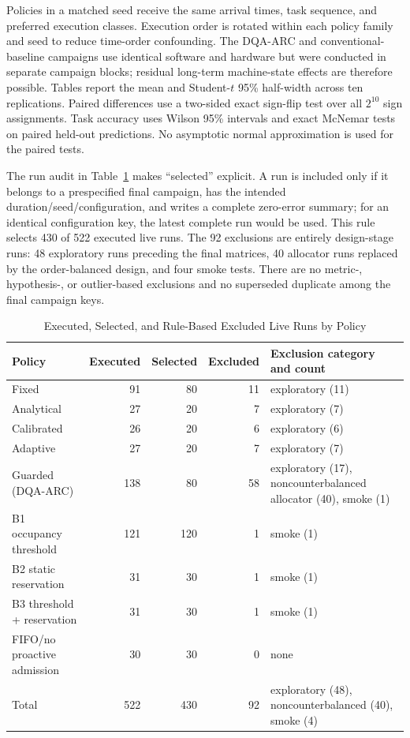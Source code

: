 \documentclass[journal]{IEEEtran}
\newcommand{\method}{DQA-ARC}
\begin{document}
Policies in a matched seed receive the same arrival times, task sequence, and preferred execution classes. Execution order is rotated within each policy family and seed to reduce time-order confounding. The \method{} and conventional-baseline campaigns use identical software and hardware but were conducted in separate campaign blocks; residual long-term machine-state effects are therefore possible. Tables report the mean and Student-$t$ 95\% half-width across ten replications. Paired differences use a two-sided exact sign-flip test over all $2^{10}$ sign assignments. Task accuracy uses Wilson 95\% intervals and exact McNemar tests on paired held-out predictions. No asymptotic normal approximation is used for the paired tests.

The run audit in Table~\ref{tab:run-audit} makes ``selected'' explicit. A run is included only if it belongs to a prespecified final campaign, has the intended duration/seed/configuration, and writes a complete zero-error summary; for an identical configuration key, the latest complete run would be used. This rule selects 430 of 522 executed live runs. The 92 exclusions are entirely design-stage runs: 48 exploratory runs preceding the final matrices, 40 allocator runs replaced by the order-balanced design, and four smoke tests. There are no metric-, hypothesis-, or outlier-based exclusions and no superseded duplicate among the final campaign keys.

\begin{table}[t]
\centering
\caption{Executed, Selected, and Rule-Based Excluded Live Runs by Policy}
\label{tab:run-audit}
\footnotesize
\begin{tabular}{@{}lrrrp{7.2cm}@{}}
\toprule
Policy & Executed & Selected & Excluded & Exclusion category and count \\
\midrule
Fixed & 91 & 80 & 11 & exploratory (11) \\
Analytical & 27 & 20 & 7 & exploratory (7) \\
Calibrated & 26 & 20 & 6 & exploratory (6) \\
Adaptive & 27 & 20 & 7 & exploratory (7) \\
Guarded (\method{}) & 138 & 80 & 58 & exploratory (17), noncounterbalanced allocator (40), smoke (1) \\
B1 occupancy threshold & 121 & 120 & 1 & smoke (1) \\
B2 static reservation & 31 & 30 & 1 & smoke (1) \\
B3 threshold + reservation & 31 & 30 & 1 & smoke (1) \\
FIFO/no proactive admission & 30 & 30 & 0 & none \\
\midrule
Total & 522 & 430 & 92 & exploratory (48), noncounterbalanced (40), smoke (4) \\
\bottomrule
\end{tabular}
\end{table}
\end{document}
